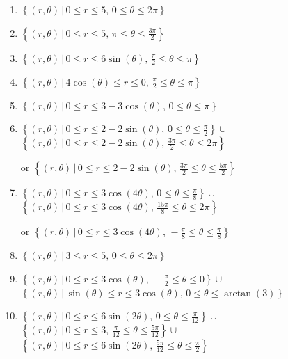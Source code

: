 \begin{enumerate}

\setcounter{enumi}{\value{HW}}

\item $\left\{ (r,\theta) \, | \, 0 \leq r \leq 5, \, 0\leq \theta \leq 2\pi \right\}$
\item $\left\{ (r,\theta) \, | \, 0 \leq r \leq 5, \, \pi \leq \theta \leq \frac{3\pi}{2} \right\}$
\item $\left\{ (r,\theta) \, | \, 0 \leq r \leq 6\sin(\theta), \, \frac{\pi}{2} \leq \theta \leq \pi \right\}$
\item $\left\{ (r,\theta) \, | \, 4\cos(\theta) \leq r \leq 0, \, \frac{\pi}{2} \leq \theta \leq \pi \right\}$
\item $\left\{ (r,\theta) \, | \, 0 \leq r \leq 3 - 3\cos(\theta), \, 0 \leq \theta \leq \pi \right\}$
\item $\left\{ (r,\theta) \, | \, 0 \leq r \leq 2-2\sin(\theta), \, 0 \leq \theta \leq \frac{\pi}{2}  \right\} \cup$ 
$\left\{ (r,\theta) \, | \, 0 \leq r \leq  2-2\sin(\theta), \, \frac{3\pi}{2} \leq \theta \leq 2\pi  \right\}$

or  $\left\{ (r,\theta) \, | \, 0 \leq r \leq 2-2\sin(\theta), \, \frac{3\pi}{2} \leq \theta \leq \frac{5\pi}{2}  \right\}$
 
\item $\left\{ (r,\theta) \, | \, 0 \leq r \leq 3\cos(4\theta), \,0 \leq \theta \leq \frac{\pi}{8} \right\} \cup$ $\left\{ (r,\theta) \, | \, 0 \leq r \leq 3\cos(4\theta), \,\frac{15\pi}{8} \leq \theta \leq 2\pi \right\}$  

or $\left\{ (r,\theta) \, | \, 0 \leq r \leq 3\cos(4\theta), \, -\frac{\pi}{8} \leq \theta \leq \frac{\pi}{8} \right\}$

\item   $\left\{ (r,\theta) \, | \, 3 \leq r \leq 5, \, 0 \leq \theta \leq 2\pi \right\}$

\item $\left\{ (r,\theta) \, | \, 0 \leq r \leq 3\cos(\theta), \, -\frac{\pi}{2} \leq \theta \leq 0 \right\} \cup$ 
$\left\{ (r,\theta) \, | \, \sin(\theta) \leq r \leq 3\cos(\theta), \, 0 \leq \theta \leq \arctan(3) \right\}$

\item  $\left\{ (r,\theta) \, | \, 0 \leq r \leq 6\sin(2\theta), \,0 \leq \theta \leq \frac{\pi}{12} \right\} \cup$ $\left\{ (r,\theta) \, | \, 0 \leq r \leq 3, \,\frac{\pi}{12} \leq \theta \leq \frac{5\pi}{12} \right\} \cup$ \\ $\left\{ (r,\theta) \, | \, 0 \leq r \leq 6\sin(2\theta), \, \frac{5\pi}{12} \leq \theta \leq \frac{\pi}{2} \right\}$

\end{enumerate}



\closegraphsfile